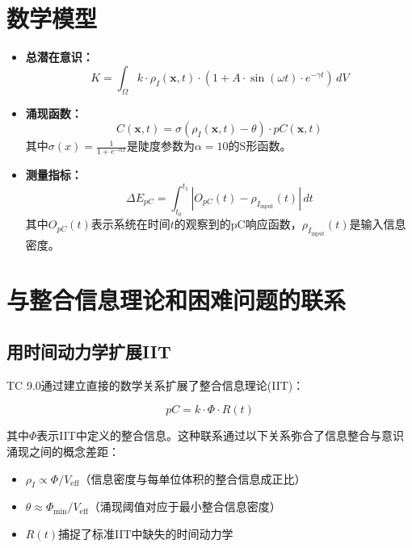 \documentclass[12pt]{article}
\begin{document}
\section{数学模型}
\begin{itemize}
    \item \textbf{总潜在意识：} 
    \begin{equation}
    K = \int_{\Omega} k \cdot \rho_I(\mathbf{x}, t) \cdot \left(1 + A \cdot \sin(\omega t) \cdot e^{-\gamma t}\right) \, dV
    \end{equation}
    
    \item \textbf{涌现函数：} 
    \begin{equation}
    C(\mathbf{x}, t) = \sigma(\rho_I(\mathbf{x}, t) - \theta) \cdot pC(\mathbf{x}, t)
    \end{equation}
    其中$\sigma(x) = \frac{1}{1 + e^{-\alpha x}}$是陡度参数为$\alpha = 10$的S形函数。
    
    \item \textbf{测量指标：} 
    \begin{equation}
    \Delta E_{pC} = \int_{t_0}^{t_1} |O_{pC}(t) - \rho_{I_{\text{input}}}(t)| \, dt
    \end{equation}
    其中$O_{pC}(t)$表示系统在时间$t$的观察到的pC响应函数，$\rho_{I_{\text{input}}}(t)$是输入信息密度。
\end{itemize}

\section{与整合信息理论和困难问题的联系}

\subsection{用时间动力学扩展IIT}
TC 9.0通过建立直接的数学关系扩展了整合信息理论(IIT)\cite{tononi2008,tononi2016}：

\begin{equation}
pC = k \cdot \Phi \cdot R(t)
\end{equation}

其中$\Phi$表示IIT中定义的整合信息。这种联系通过以下关系弥合了信息整合与意识涌现之间的概念差距：

\begin{itemize}
    \item $\rho_I \propto \Phi / V_{\text{eff}}$（信息密度与每单位体积的整合信息成正比）
    \item $\theta \approx \Phi_{\text{min}} / V_{\text{eff}}$（涌现阈值对应于最小整合信息密度）
    \item $R(t)$捕捉了标准IIT中缺失的时间动力学
\end{itemize}
\end{document}

